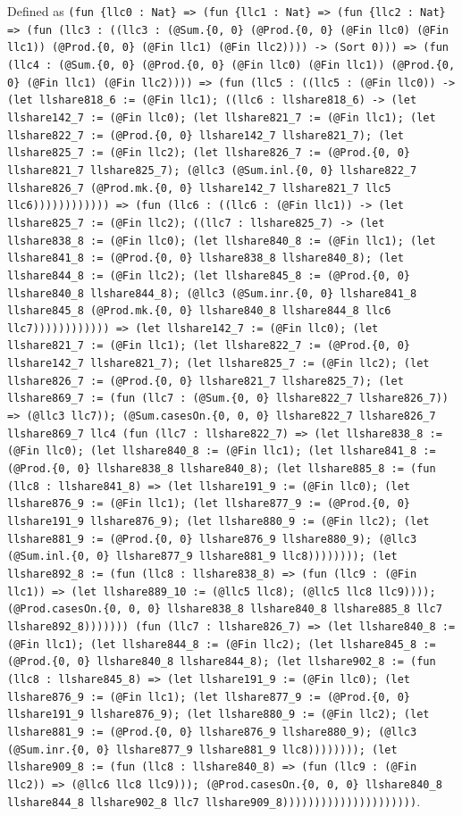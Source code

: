 \documentclass[11pt]{article}
\begin{document}
\noindent Defined as \texttt{(fun \{llc0 : Nat\} => (fun \{llc1 : Nat\} => (fun \{llc2 : Nat\} => (fun (llc3 : ((llc3 : (@Sum.\{0, 0\} (@Prod.\{0, 0\} (@Fin llc0) (@Fin llc1)) (@Prod.\{0, 0\} (@Fin llc1) (@Fin llc2)))) -> (Sort 0))) => (fun (llc4 : (@Sum.\{0, 0\} (@Prod.\{0, 0\} (@Fin llc0) (@Fin llc1)) (@Prod.\{0, 0\} (@Fin llc1) (@Fin llc2)))) => (fun (llc5 : ((llc5 : (@Fin llc0)) -> (let llshare818\_6 := (@Fin llc1); ((llc6 : llshare818\_6) -> (let llshare142\_7 := (@Fin llc0); (let llshare821\_7 := (@Fin llc1); (let llshare822\_7 := (@Prod.\{0, 0\} llshare142\_7 llshare821\_7); (let llshare825\_7 := (@Fin llc2); (let llshare826\_7 := (@Prod.\{0, 0\} llshare821\_7 llshare825\_7); (@llc3 (@Sum.inl.\{0, 0\} llshare822\_7 llshare826\_7 (@Prod.mk.\{0, 0\} llshare142\_7 llshare821\_7 llc5 llc6)))))))))))) => (fun (llc6 : ((llc6 : (@Fin llc1)) -> (let llshare825\_7 := (@Fin llc2); ((llc7 : llshare825\_7) -> (let llshare838\_8 := (@Fin llc0); (let llshare840\_8 := (@Fin llc1); (let llshare841\_8 := (@Prod.\{0, 0\} llshare838\_8 llshare840\_8); (let llshare844\_8 := (@Fin llc2); (let llshare845\_8 := (@Prod.\{0, 0\} llshare840\_8 llshare844\_8); (@llc3 (@Sum.inr.\{0, 0\} llshare841\_8 llshare845\_8 (@Prod.mk.\{0, 0\} llshare840\_8 llshare844\_8 llc6 llc7)))))))))))) => (let llshare142\_7 := (@Fin llc0); (let llshare821\_7 := (@Fin llc1); (let llshare822\_7 := (@Prod.\{0, 0\} llshare142\_7 llshare821\_7); (let llshare825\_7 := (@Fin llc2); (let llshare826\_7 := (@Prod.\{0, 0\} llshare821\_7 llshare825\_7); (let llshare869\_7 := (fun (llc7 : (@Sum.\{0, 0\} llshare822\_7 llshare826\_7)) => (@llc3 llc7)); (@Sum.casesOn.\{0, 0, 0\} llshare822\_7 llshare826\_7 llshare869\_7 llc4 (fun (llc7 : llshare822\_7) => (let llshare838\_8 := (@Fin llc0); (let llshare840\_8 := (@Fin llc1); (let llshare841\_8 := (@Prod.\{0, 0\} llshare838\_8 llshare840\_8); (let llshare885\_8 := (fun (llc8 : llshare841\_8) => (let llshare191\_9 := (@Fin llc0); (let llshare876\_9 := (@Fin llc1); (let llshare877\_9 := (@Prod.\{0, 0\} llshare191\_9 llshare876\_9); (let llshare880\_9 := (@Fin llc2); (let llshare881\_9 := (@Prod.\{0, 0\} llshare876\_9 llshare880\_9); (@llc3 (@Sum.inl.\{0, 0\} llshare877\_9 llshare881\_9 llc8)))))))); (let llshare892\_8 := (fun (llc8 : llshare838\_8) => (fun (llc9 : (@Fin llc1)) => (let llshare889\_10 := (@llc5 llc8); (@llc5 llc8 llc9)))); (@Prod.casesOn.\{0, 0, 0\} llshare838\_8 llshare840\_8 llshare885\_8 llc7 llshare892\_8))))))) (fun (llc7 : llshare826\_7) => (let llshare840\_8 := (@Fin llc1); (let llshare844\_8 := (@Fin llc2); (let llshare845\_8 := (@Prod.\{0, 0\} llshare840\_8 llshare844\_8); (let llshare902\_8 := (fun (llc8 : llshare845\_8) => (let llshare191\_9 := (@Fin llc0); (let llshare876\_9 := (@Fin llc1); (let llshare877\_9 := (@Prod.\{0, 0\} llshare191\_9 llshare876\_9); (let llshare880\_9 := (@Fin llc2); (let llshare881\_9 := (@Prod.\{0, 0\} llshare876\_9 llshare880\_9); (@llc3 (@Sum.inr.\{0, 0\} llshare877\_9 llshare881\_9 llc8)))))))); (let llshare909\_8 := (fun (llc8 : llshare840\_8) => (fun (llc9 : (@Fin llc2)) => (@llc6 llc8 llc9))); (@Prod.casesOn.\{0, 0, 0\} llshare840\_8 llshare844\_8 llshare902\_8 llc7 llshare909\_8)))))))))))))))))))))}.\par
\end{document}
